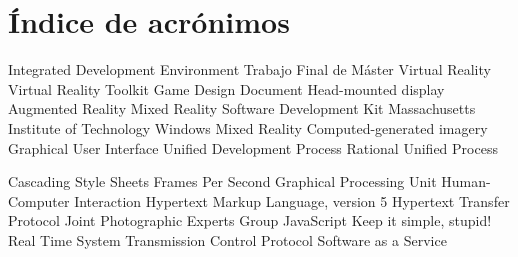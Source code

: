 \chapter*{Índice de acrónimos}
{
\small
\begin{acronym}[XXXXXXXX]

      {Integrated Development Environment}
      {Trabajo Final de Máster}
       {Virtual Reality}
     {Virtual Reality Toolkit}
      {Game Design Document}
      {Head-mounted display}
       {Augmented Reality}
       {Mixed Reality}
      {Software Development Kit}
      {Massachusetts Institute of Technology}
      {Windows Mixed Reality}
      {Computed-generated imagery}
      {Graphical User Interface}  
      {Unified Development Process}
      {Rational Unified Process}

      {Cascading Style Sheets}
      {Frames Per Second}
      {Graphical Processing Unit}
      {Human-Computer Interaction}
    {Hypertext Markup Language, version 5}
     {Hypertext Transfer Protocol}  
     {Joint Photographic Experts Group}
       {JavaScript}
     {Keep it simple, stupid!} 
      {Real Time System}
      {Transmission Control Protocol}  
     {Software as a Service}
\end{acronym}
}


